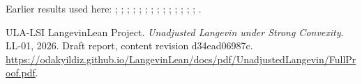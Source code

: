 \documentclass[11pt,a4paper]{article}
\begin{document}
Earlier results used here: \cite[Section~3.17.2]{LangevinLean2026ULASC}; \cite[Section~3.19.1]{LangevinLean2026ULASC}; \cite[Section~3.22.19]{LangevinLean2026ULASC}; \cite[Section~3.22.23]{LangevinLean2026ULASC}; \cite[Section~3.23.9]{LangevinLean2026ULASC}; \cite[Section~3.26.3]{LangevinLean2026ULASC}; \cite[Section~3.32.5]{LangevinLean2026ULASC}; \cite[Section~3.36.7]{LangevinLean2026ULASC}; \cite[Section~3.45.1]{LangevinLean2026ULASC}; \cite[Section~3.45.3]{LangevinLean2026ULASC}; \cite[Section~3.45.4]{LangevinLean2026ULASC}; \cite[Section~3.8.17]{LangevinLean2026ULASC}; \cite[Section~3.8.19]{LangevinLean2026ULASC}; \cite[Section~3.8.20]{LangevinLean2026ULASC}; \cite[Section~3.8.22]{LangevinLean2026ULASC}.

\begin{thebibliography}{ULA-LSI}
LangevinLean Project. \emph{Unadjusted Langevin under Strong Convexity}. LL-01, 2026. Draft report, content revision d34ead06987c. \url{https://odakyildiz.github.io/LangevinLean/docs/pdf/UnadjustedLangevin/FullProof.pdf}.
\end{thebibliography}
\end{document}
